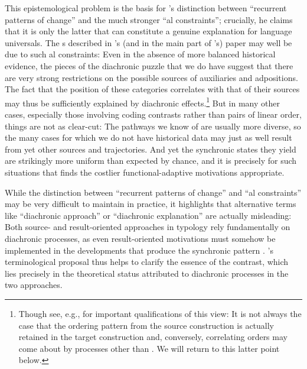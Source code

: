 \documentclass[output=paper]{langsci/langscibook}
\begin{document}
This epistemological problem is the basis for ’s distinction between “recurrent patterns of change” and the much stronger “al constraints”; crucially, he claims that it is only the latter that can constitute a genuine explanation for language universals. The s described in ’s (and in the main part of ’s) paper may well be due to such al constraints: Even in the absence of more balanced historical evidence, the pieces of the diachronic puzzle that we do have suggest that there are very strong restrictions on the possible sources of auxiliaries and adpositions. The fact that the position of these categories correlates with that of their sources may thus be sufficiently explained by diachronic  effects.\footnote{Though see, e.g., \citet[210--215]{Harris1995_Hist} for important qualifications of this view: It is not always the case that the ordering pattern from the source construction is actually retained in the target construction and, conversely, correlating orders may come about by processes other than . We will return to this latter point below.} But in many other cases, especially those involving coding contrasts rather than pairs of linear order, things are not as clear-cut: The pathways we know of are usually more diverse, so the many cases for which we do not have historical data may just as well result from yet other sources and trajectories. And yet the synchronic states they yield are strikingly more uniform than expected by chance, and it is precisely for such situations that  finds the costlier functional-adaptive motivations appropriate.

\largerpage
While the distinction between “recurrent patterns of change” and “al constraints” may be very difficult to maintain in practice, it highlights that alternative terms like “diachronic approach” or “diachronic explanation” are actually misleading: Both source- and result-oriented approaches in typology rely fundamentally on diachronic processes, as even result-oriented motivations must somehow be implemented in the developments that produce the synchronic pattern \citep{Haspelmath1999_Opt}. ’s terminological proposal thus helps to clarify the essence of the contrast, which lies precisely in the theoretical status attributed to diachronic processes in the two approaches. 
\end{document}
